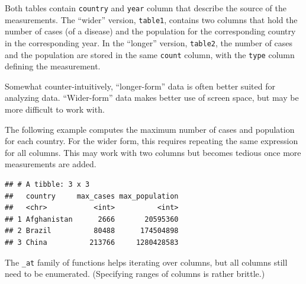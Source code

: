 \documentclass[]{book}
\newenvironment{Shaded}{}{}
\newcommand{\DataTypeTok}[1]{#1}
\newcommand{\KeywordTok}[1]{\textcolor[rgb]{0.00,0.00,1.00}{#1}}
\newcommand{\NormalTok}[1]{#1}
\newcommand{\OperatorTok}[1]{#1}
\newcommand{\StringTok}[1]{\textcolor[rgb]{0.00,0.50,0.50}{#1}}
\begin{document}
Both tables contain \texttt{country} and \texttt{year} column that describe the source of the measurements.
The ``wider'' version, \texttt{table1}, contains two columns that hold the number of cases (of a disease) and the population for the corresponding country in the corresponding year.
In the ``longer'' version, \texttt{table2}, the number of cases and the population are stored in the same \texttt{count} column, with the \texttt{type} column defining the measurement.

Somewhat counter-intuitively, ``longer-form'' data is often better suited for analyzing data.
``Wider-form'' data makes better use of screen space, but may be more difficult to work with.

The following example computes the maximum number of cases and population for each country.
For the wider form, this requires repeating the same expression for all columns.
This may work with two columns but becomes tedious once more measurements are added.

\begin{Shaded}
\end{Shaded}

\begin{verbatim}
## # A tibble: 3 x 3
##   country     max_cases max_population
##   <chr>           <int>          <int>
## 1 Afghanistan      2666       20595360
## 2 Brazil          80488      174504898
## 3 China          213766     1280428583
\end{verbatim}

The \texttt{\_at} family of functions helps iterating over columns, but all columns still need to be enumerated.
(Specifying ranges of columns is rather brittle.)

\begin{Shaded}
\end{Shaded}
\end{document}
